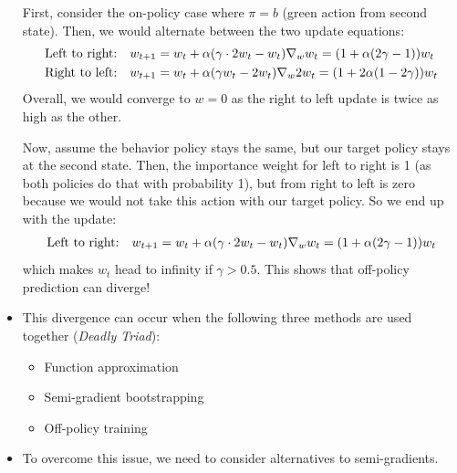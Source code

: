 \begin{itemize}
	First, consider the on-policy case where $\pi=b$ (green action from second state). Then, we would alternate between the two update equations:
	\begin{equation*}
		\begin{split}
		\text{Left to right: }\hspace{2mm}w_{t+1} & = w_t + \alpha (\gamma \cdot 2w_t-w_t)\nabla_w w_t = (1+\alpha(2\gamma-1)) w_t\\
		\text{Right to left: }\hspace{2mm}w_{t+1} & = w_t + \alpha (\gamma w_t-2w_t)\nabla_w 2w_t = (1+2\alpha(1-2\gamma)) w_t\\
		\end{split}
	\end{equation*}
	Overall, we would converge to $w=0$ as the right to left update is twice as high as the other.
	
	Now, assume the behavior policy stays the same, but our target policy stays at the second state. Then, the importance weight for left to right is 1 (as both policies do that with probability 1), but from right to left is zero because we would not take this action with our target policy. So we end up with the update:
	\begin{equation*}
		\begin{split}
			\text{Left to right: }\hspace{2mm}w_{t+1} & = w_t + \alpha (\gamma \cdot 2w_t-w_t)\nabla_w w_t = (1+\alpha(2\gamma-1)) w_t\\
		\end{split}
	\end{equation*}
	which makes $w_t$ head to infinity if $\gamma>0.5$. This shows that off-policy prediction can diverge!
	
	\item This divergence can occur when the following three methods are used together (\textit{Deadly Triad}):
	\begin{itemize}
		\item Function approximation
		\item Semi-gradient bootstrapping
		\item Off-policy training
	\end{itemize}
	\item To overcome this issue, we need to consider alternatives to semi-gradients.
	
\end{itemize}

